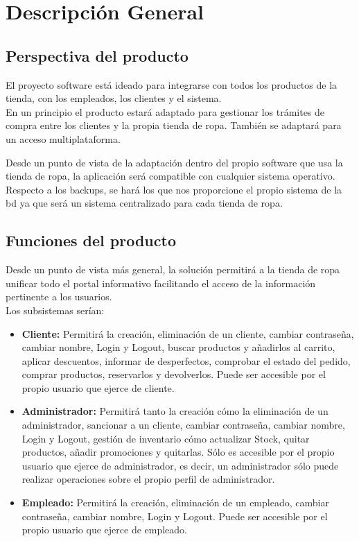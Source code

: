\section{Descripción General }
\label{sec:desc_gen}
\subsection{Perspectiva del producto}
El proyecto software está ideado para integrarse con todos los productos de la tienda, con los empleados, los clientes y el sistema.\\
En un principio el producto estará adaptado para gestionar los trámites de compra entre los clientes y la propia tienda de ropa. También se adaptará para un acceso multiplataforma.

Desde un punto de vista de la adaptación dentro del propio software que usa la tienda de ropa, la aplicación será compatible con cualquier sistema operativo.\\
Respecto a los backups, se hará los que nos proporcione el propio sistema de la \gls{bd} ya que será un sistema centralizado para cada tienda de ropa.
\subsection{Funciones del producto}
Desde un punto de vista más general, la solución permitirá a la tienda de ropa unificar todo el portal
informativo facilitando el acceso de la información pertinente a los usuarios.\\
Los subsistemas serían:

\begin{itemize}
    \item\textbf{Cliente: }Permitirá la creación, eliminación de un cliente, cambiar contraseña, cambiar nombre, Login y Logout, buscar productos y añadirlos al carrito, aplicar descuentos, informar de desperfectos, comprobar el estado del pedido, comprar productos, reservarlos y devolverlos. Puede ser accesible por el propio usuario que ejerce de cliente.
    \item\textbf{Administrador: }Permitirá tanto la creación cómo la eliminación de un administrador, sancionar a un cliente, cambiar contraseña, cambiar nombre, Login y Logout, gestión de inventario cómo actualizar Stock, quitar productos, añadir promociones y quitarlas. Sólo es accesible por el propio usuario que ejerce de administrador, es decir, un administrador sólo puede realizar operaciones sobre el propio perfil de administrador.
    \item\textbf{Empleado: }Permitirá la creación, eliminación de un empleado, cambiar contraseña, cambiar nombre, Login y Logout. Puede ser accesible por el propio usuario que ejerce de empleado.
\end{itemize}

